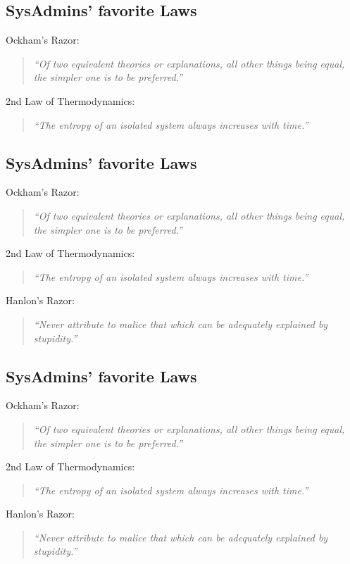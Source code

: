 \documentclass[xga]{xdvislides}
\newcommand{\smallish}{\fontsize{18}{18}\selectfont}
\begin{document}
\subsection{SysAdmins' favorite Laws}
\smallish
Ockham's Razor:
\begin{quote}
{\em ``Of two equivalent theories or explanations, all other things being
equal, the simpler one is to be preferred.''}
\end{quote}

2nd Law of Thermodynamics:
\begin{quote}
{\em ``The entropy of an isolated system always increases with time.''}
\end{quote}
\Normalsize

\subsection{SysAdmins' favorite Laws}
\smallish
Ockham's Razor:
\begin{quote}
{\em ``Of two equivalent theories or explanations, all other things being
equal, the simpler one is to be preferred.''}
\end{quote}

2nd Law of Thermodynamics:
\begin{quote}
{\em ``The entropy of an isolated system always increases with time.''}
\end{quote}

Hanlon's Razor:
\begin{quote}
{\em ``Never attribute to malice that which can be adequately explained by
stupidity.''}
\end{quote}
\Normalsize

\subsection{SysAdmins' favorite Laws}
\smallish
Ockham's Razor:
\begin{quote}
{\em ``Of two equivalent theories or explanations, all other things being
equal, the simpler one is to be preferred.''}
\end{quote}

2nd Law of Thermodynamics:
\begin{quote}
{\em ``The entropy of an isolated system always increases with time.''}
\end{quote}

Hanlon's Razor:
\begin{quote}
{\em ``Never attribute to malice that which can be adequately explained by
stupidity.''}
\end{quote}
\end{document}
